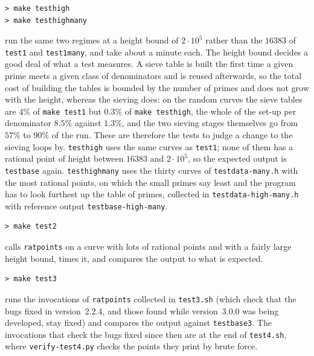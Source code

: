 \documentclass[12pt,a4paper,oneside]{amsart}
\begin{document}
\begin{verbatim}
> make testhigh
> make testhighmany
\end{verbatim}
run the same two regimes at a height bound of $2\cdot10^5$ rather than the
$16383$ of \texttt{test1} and \texttt{test1many}, and take about a minute
each. The height bound decides a good deal of what a test measures. A sieve table
is built the first time a given prime meets a given class of denominators and
is reused afterwards, so the total cost of building the tables is bounded by
the number of primes and does not grow with the height, whereas the sieving
does: on the random curves the sieve tables are $4\%$ of \texttt{make test1}
but $0.3\%$ of \texttt{make testhigh}, the whole of the set-up per
denominator $8.5\%$ against $1.3\%$, and the two sieving stages themselves go
from $57\%$ to $90\%$ of the run. These are therefore the tests to judge a
change to the sieving loops by. \texttt{testhigh} uses the same curves as
\texttt{test1}; none of them has a rational point of height between $16383$
and $2\cdot10^5$, so the expected output is \texttt{testbase} again.
\texttt{testhighmany} uses the thirty
curves of \texttt{testdata-many.h} with the most rational points, on which
the small primes say least and the program has to look furthest up the table
of primes, collected in \texttt{testdata-high-many.h} with reference output
\texttt{testbase-high-many}.

\begin{verbatim}
> make test2
\end{verbatim}
calls \texttt{ratpoints} on a curve with lots of rational points and with
a fairly large height bound, times it, and compares the output to what is
expected.

\begin{verbatim}
> make test3
\end{verbatim}
runs the invocations of \texttt{ratpoints} collected in \texttt{test3.sh}
(which check that the bugs fixed in version~2.2.4, and those found while
version~3.0.0 was being developed, stay fixed) and
compares the output against \texttt{testbase3}. The invocations that check
the bugs fixed since then are at the end of \texttt{test4.sh}, where
\texttt{verify-test4.py} checks the points they print by brute force.
\end{document}
